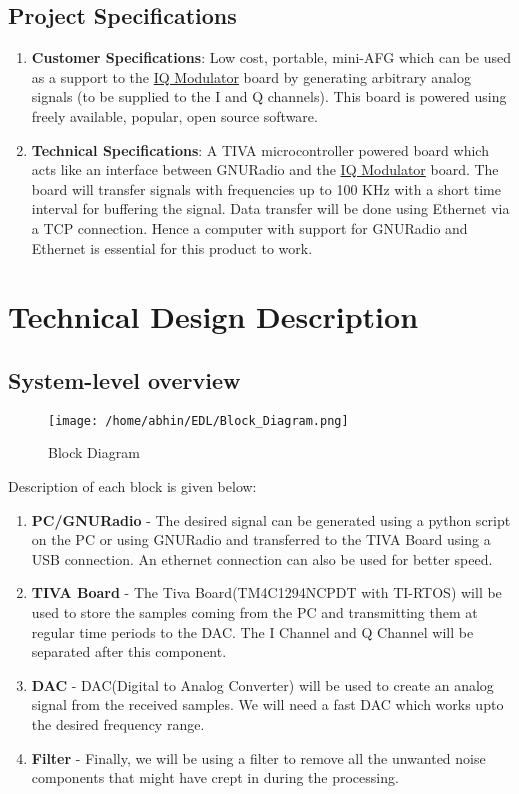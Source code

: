 \documentclass{article}
\begin{document}
\subsection{Project Specifications}
\begin{enumerate}
\item \textbf{Customer Specifications}: Low cost, portable, mini-AFG which can be used as a support to the \href{http://wel.ee.iitb.ac.in/teaching_labs/Communication/index.html}{IQ Modulator} board by generating arbitrary analog signals (to be supplied to the I and Q channels). This board is powered using freely available, popular, open source software.
\item \textbf{Technical Specifications}: 
  A TIVA microcontroller powered board which acts like an
interface between GNURadio and the \href{http://wel.ee.iitb.ac.in/teaching_labs/Communication/index.html}{IQ Modulator} board. The board will transfer signals with frequencies up to 100 KHz with a short time interval for buffering the signal. Data transfer will be done using Ethernet via a TCP connection. Hence a computer with support for GNURadio and Ethernet is essential for this product to work.
\end{enumerate}

\section{Technical Design Description}
\subsection{System-level overview}
\pagebreak
\begin{figure}[htp]
\centering
\texttt{[image: /home/abhin/EDL/Block\_Diagram.png]}
\caption{Block Diagram}
\label{}
\end{figure}
Description of each block is given below:
\begin{enumerate}
\item \textbf{PC/GNURadio} - The desired signal can be generated using a python script on the PC or using GNURadio and transferred to the TIVA Board using a USB connection. An ethernet connection can also be used for better speed.
\item \textbf{TIVA Board} - The Tiva Board(TM4C1294NCPDT with TI-RTOS) will be used to store the samples coming from the PC and transmitting them at regular time periods to the DAC. The I Channel and Q Channel will be separated after this component.
\item \textbf{DAC} - DAC(Digital to Analog Converter) will be used to create an analog signal from the received samples. We will need a fast DAC which works upto the desired frequency range.
\item \textbf{Filter} - Finally, we will be using a filter to remove all the unwanted noise components that might have crept in during the processing.
\end{enumerate}
\end{document}
